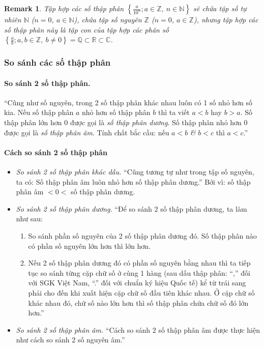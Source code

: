 \documentclass{article}
\numberwithin{equation}{section}
\newtheorem{remark}{Remark}[section]
\begin{document}
\begin{remark}
	Tập hợp các số thập phân $\left\{\frac{a}{10^n};a\in\mathbb{Z},\ n\in\mathbb{N}\right\}$ sẽ chứa tập số tự nhiên $\mathbb{N}$ ($n = 0$, $a\in\mathbb{N}$), chứa tập số nguyên $\mathbb{Z}$ ($n = 0$, $a\in\mathbb{Z}$), nhưng tập hợp các số thập phân này là tập con của tập hợp các phân số $\left\{\frac{a}{b};a,b\in\mathbb{Z},\ b\ne 0\right\} = \mathbb{Q}\subset\mathbb{R}\subset\mathbb{C}$.
\end{remark}

\subsubsection{So sánh các số thập phân}

\paragraph{So sánh 2 số thập phân.} ``Cũng như số nguyên, trong 2 số thập phân khác nhau luôn có 1 số nhỏ hơn số kia. Nếu số thập phân $a$ nhỏ hơn số thập phân $b$ thì ta viết $a < b$ hay $b > a$. Số thập phân lớn hơn 0 được gọi là \emph{số thập phân dương}. Số thập phân nhỏ hơn 0 được gọi là \emph{số thập phân âm}. Tính chất bắc cầu: nếu $a < b$ \textit{\&} $b < c$ thì $a < c$.'' \cite[p. 45]{Thai_Anh_Dat_Ha_Loan_Nam_Quang_Toan_6_tap_2}

\paragraph{Cách so sánh 2 số thập phân}
\begin{itemize}
	\item \textit{So sánh 2 số thập phân khác dấu.} ``Cũng tương tự như trong tập số nguyên, ta có: Số thập phân âm luôn nhỏ hơn số thập phân dương.'' Bởi vì: số thập phân âm $< 0 <$ số thập phân dương.
	\item \textit{So sánh 2 số thập phân dương.} ``Để so sánh 2 số thập phân dương, ta làm như sau:
	\begin{enumerate}
		\item So sánh phần số nguyên của 2 số thập phân dương đó. Số thập phân nào có phần số nguyên lớn hơn thì lớn hơn.
		\item Nếu 2 số thập phân dương đó có phần số nguyên bằng nhau thì ta tiếp tục so sánh từng cặp chữ số ở cùng 1 hàng (sau dấu thập phân: ``,'' đối với SGK Việt Nam, ``.'' đối với chuẩn ký hiệu Quốc tế) kể từ trái sang phải cho đến khi xuất hiện cặp chữ số đầu tiên khác nhau. Ở cặp chữ số khác nhau đó, chữ số nào lớn hơn thì số thập phân chứa chữ số đó lớn hơn.'' 
	\end{enumerate}
	\item \textit{So sánh 2 số thập phân âm.} ``Cách so sánh 2 số thập phân âm được thực hiện như cách so sánh 2 số nguyên âm.'' 
\end{itemize}
\end{document}

